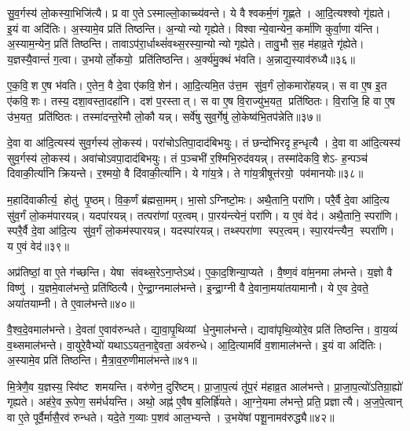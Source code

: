 सु॒व॒र्गस्य॑ लो॒कस्या॒भिजि॑त्यै। प्र वा ए॒तेऽस्माल्लो॒काच्च्य॑वन्ते। ये वैश्वकर्म॒णं गृ॒ह्णते। आ॒दि॒त्यश्श्वो गृ॑ह्यते। इ॒यं वा अदि॑तिः। अ॒स्यामे॒व प्रति॑ तिष्ठन्ति। अ॒न्योन्यो गृह्येते। विश्वान्ये॒वान्येन॒ कर्मा॑णि कुर्वा॒णा य॑न्ति। अ॒स्याम॒न्येन॒ प्रति॑ तिष्ठन्ति। तावाऽप॑रा॒र्धाथ्सं॑वथ्स॒रस्या॒न्योन्यो गृह्येते। तावु॒भौ स॒ह म॑हाव्र॒ते गृ॑ह्येते। य॒ज्ञस्यै॒वान्तं॑ ग॒त्वा। उ॒भयोर्लो॒कयो॒ प्रति॑तिष्ठन्ति। अ॒र्क्य॑मु॒क्थं भ॑वति। अ॒न्नाद्य॒स्याव॑रुध्यै॥३६॥\anuvakamend[स॒मा॒यच्छ॑त्यतिग्रा॒ह्या॑ गृह्यन्ते गृ॒ह्यते॑ संवथ्स॒रस्या॒न्योन्यो गृह्येते॒ पञ्च॑ च]

ए॒क॒वि॒श ए॒ष भ॑वति। ए॒तेन॒ वै दे॒वा ए॑कवि॒शेन॑। आ॒दि॒त्यमि॒त उ॑त्त॒म सु॑व॒र्गं लो॒कमारो॑हयन्न्। स वा ए॒ष इ॒त ए॑कवि॒शः। तस्य॒ दशा॒वस्ता॒दहा॑नि। दश॑ प॒रस्तात्। स वा ए॒ष वि॒राज्यु॑भ॒यत॒ प्रति॑ष्ठितः। वि॒राजि॒ हि वा ए॒ष उ॑भ॒यत॒ प्रति॑ष्ठितः। तस्मा॑दन्त॒रेमौ लो॒कौ यन्न्। सर्वे॑षु सुव॒र्गेषु॑ लो॒केष्व॑भि॒तप॑न्नेति॥३७॥

दे॒वा वा आ॑दि॒त्यस्य॑ सुव॒र्गस्य॑ लो॒कस्य॑। परा॑चोऽतिपा॒दाद॑बिभयुः। तं छन्दो॑भिरदृह॒न्धृत्यै। दे॒वा वा आ॑दि॒त्यस्य॑ सुव॒र्गस्य॑ लो॒कस्य॑। अवा॑चोऽवपा॒दाद॑बिभयुः। तं प॒ञ्चभी॑ र॒श्मिभि॒रुद॑वयन्न्। तस्मा॑देकवि॒शेऽ- ह॒न्पञ्च॑ दिवाकी॒र्त्या॑नि क्रियन्ते। र॒श्मयो॒ वै दि॑वाकी॒र्त्या॑नि। ये गा॑य॒त्रे। ते गा॑य॒त्रीषूत्त॑रयो॒ पव॑मानयोः॥३८॥

म॒हादि॑वाकीर्त्य॒ होतु॑ पृ॒ष्ठम्। वि॒क॒र्णं ब्र॑ह्मसा॒मम्। भा॒सोऽग्निष्टो॒मः। अथै॒तानि॒ परा॑णि। परै॒र्वै दे॒वा आ॑दि॒त्य सु॑व॒र्गं लो॒कम॑पारयन्न्। यदपा॑रयन्न्। तत्परा॑णां पर॒त्वम्। पा॒रय॑न्त्येनं॒ परा॑णि। य ए॒वं वेद॑। अथै॒तानि॒ स्परा॑णि। स्परै॒र्वै दे॒वा आ॑दि॒त्य सु॑व॒र्गं लो॒कम॑स्पारयन्न्। यदस्पा॑रयन्न्। तथ्स्परा॑णा स्पर॒त्वम्। स्पा॒रय॑न्त्यैन॒ स्परा॑णि। य ए॒वं वेद॑॥३९॥\anuvakamend[ए॒ति॒ पव॑मानयो॒ स्परा॑णि॒ पञ्च॑ च]

अप्र॑तिष्ठां॒ वा ए॒ते ग॑च्छन्ति। येषा संवथ्स॒रेऽना॒प्तेऽथ॑। ए॒का॒द॒शिन्या॒प्यते। वै॒ष्ण॒वं वा॑म॒नमा ल॑भन्ते। य॒ज्ञो वै विष्णु॑। य॒ज्ञमे॒वाल॑भन्ते॒ प्रति॑ष्ठित्यै। ऐ॒न्द्रा॒ग्नमाल॑भन्ते। इ॒न्द्रा॒ग्नी वै दे॒वाना॒मया॑तयामानौ। ये ए॒व दे॒वते॒ अया॑तयाम्नी। ते ए॒वाल॑भन्ते॥४०॥

वै॒श्व॒दे॒वमाल॑भन्ते। दे॒वता॑ ए॒वाव॑रुन्धते। द्या॒वा॒पृ॒थिव्यां धे॒नुमाल॑भन्ते। द्यावा॑पृथि॒व्योरे॒व प्रति॑ तिष्ठन्ति। वा॒य॒व्यं॑ व॒थ्समाल॑भन्ते। वा॒युरे॒वैभ्यो॑ यथाऽऽयत॒नाद्दे॒वता॒ अव॑रुन्धे। आ॒दि॒त्यामविं॑ व॒शामाल॑भन्ते। इ॒यं वा अदि॑तिः। अ॒स्यामे॒व प्रति॑ तिष्ठन्ति। मै॒त्रा॒व॒रु॒णीमाल॑भन्ते॥४१॥

मि॒त्रेणै॒व य॒ज्ञस्य॒ स्वि॑ष्ट शमयन्ति। वरु॑णेन॒ दुरि॑ष्टम्। प्रा॒जा॒प॒त्यं तू॑प॒रं म॑हाव्र॒त आल॑भन्ते। प्रा॒जा॒प॒त्यो॑ऽतिग्रा॒ह्यो॑ गृह्यते। अह॑रे॒व रू॒पेण॒ सम॑र्धयन्ति। अथो॒ अह्न॑ ए॒वैष ब॒लिर्ह्रि॑यते। आ॒ग्ने॒यमा ल॑भन्ते॒ प्रति॒ प्रज्ञात्यै। अ॒ज॒पे॒त्वान् वा ए॒ते पूर्वै॒र्मासै॒रव॑ रुन्धते। यदे॒ते ग॒व्याः प॒शव॑ आल॒भ्यन्ते। उ॒भये॑षां पशू॒नामव॑रुद्ध्यै॥४२॥

